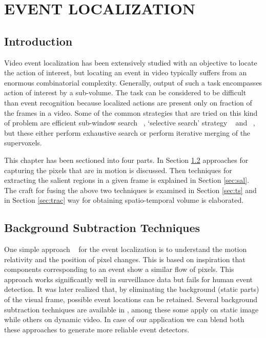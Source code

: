 \chapter{EVENT LOCALIZATION}
 \label{chap:eventLo}
\section{Introduction}
Video event localization has been extensively studied with an objective to locate the action of interest, but locating an event in video typically suffers from an enormous combinatorial complexity.  Generally, output of such a task encompasses action of interest by a sub-volume.  The task can be considered to be difficult than event recognition because localized actions are present only on fraction of the frames in a video.  Some of the common strategies that are tried on this kind of problem are efficient sub-window search ~\citep{subwindowsearch}, `selective search' strategy ~\citep{selectivesearch}  and ~\cite{tubelet}, but these either perform exhaustive search or perform iterative merging of the supervoxels. 

\par This chapter has been sectioned into four parts.  In Section \ref{sec:bst} approaches for capturing the pixels that are in motion is discussed.  Then techniques for extracting the salient regions in a given frame is explained in Section \ref{sec:sal}.  The craft for fusing the above two techniques is examined in Section \ref{sec:ts} and in Section \ref{sec:trac} way for obtaining spatio-temporal volume is elaborated.

\section{Background Subtraction Techniques} 
 \label{sec:bst}
\par One simple approach ~\citep{Basharat08} for the event localization is to understand the motion relativity and the position of pixel changes. This is based on inspiration that components corresponding to an event show a similar flow of pixels.  This approach works significantly well in surveillance data but fails for human event detection.  It was later realized that, by eliminating the background (static parts) of the visual frame,  possible event locations can be retained.  Several background subtraction techniques are available in \cite{Piccardi04}, among these some apply on static image while others on dynamic video.  In case of our application we can blend both these approaches to generate more reliable event detectors.

